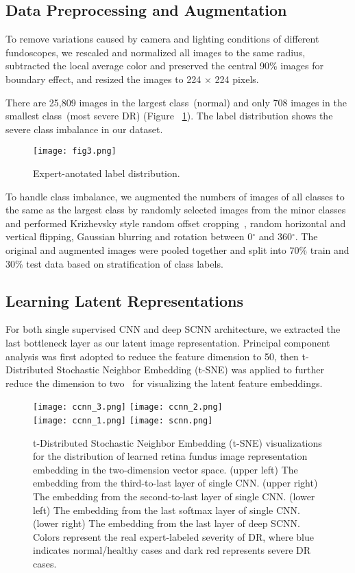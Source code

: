 \documentclass{article}
\begin{document}
\subsection{Data Preprocessing and Augmentation}
To remove variations caused by camera and lighting conditions of different fundoscopes, we rescaled and normalized all images to the same radius, subtracted the local average color and preserved the central 90\% images for boundary effect, and resized the images to 224 $\times$ 224 pixels.

There are 25,809 images in the largest class~(normal) and only 708 images in the smallest class~(most severe DR) (Figure ~\ref{fig:distr}). The label distribution shows the severe class imbalance in our dataset.

\begin{figure}[ht]
  \centering
  \texttt{[image: fig3.png]}
  \caption{Expert-anotated label distribution.}
  \label{fig:distr}
\end{figure}

To handle class imbalance, we augmented the numbers of images of all classes to the same as the largest class by randomly selected images from the minor classes and performed Krizhevsky style random offset cropping~\citep{krizhevsky2012imagenet}, random horizontal and vertical flipping, Gaussian blurring and rotation between 0$^\circ$ and 360$^\circ$. 
The original and augmented images were pooled together and split into 70\% train and 30\% test data based on stratification of class labels.  

\subsection{Learning Latent Representations}
For both single supervised CNN and deep SCNN architecture, we extracted the last bottleneck layer as our latent image representation. 
Principal component analysis was first adopted to reduce the feature dimension to 50, then t-Distributed Stochastic Neighbor Embedding (t-SNE) was applied to further reduce the dimension to two~\citep{maaten2008visualizing} for visualizing the latent feature embeddings.

\begin{figure*}[ht]
  \centering
  \texttt{[image: ccnn\_3.png]}
  \texttt{[image: ccnn\_2.png]} \\
  \texttt{[image: ccnn\_1.png]}
  \texttt{[image: scnn.png]}
  \caption{t-Distributed Stochastic Neighbor Embedding (t-SNE) visualizations for the distribution of learned retina fundus image representation embedding in the two-dimension vector space. (upper left) The embedding from the third-to-last layer of single CNN. (upper right) The embedding from the second-to-last layer of single CNN. (lower left) The embedding from the last softmax layer of single CNN. (lower right) The embedding from the last layer of deep SCNN. Colors represent the real expert-labeled severity of DR, where blue indicates normal/healthy cases and dark red represents severe DR cases.}
  \label{fig:embeddings}
\end{figure*}
\end{document}
